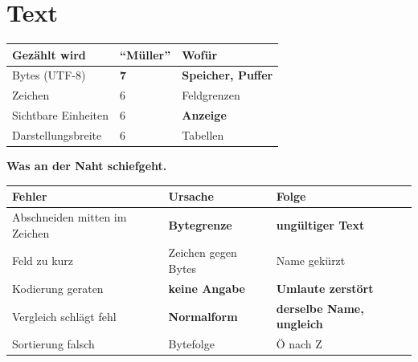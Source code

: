 \chapter{Text}\label{kap:text}

\begin{merksatz}
\begin{center}
\renewcommand{\arraystretch}{1.5}
\begin{tabular}{@{}P{3.2cm}P{2.2cm}P{2.6cm}@{}}
\toprule
\textbf{Gezählt wird} & \enquote{Müller} & \textbf{Wofür}\\
\midrule
Bytes (UTF-8) & $\mathbf{7}$ & \textbf{Speicher, Puffer}\\
Zeichen & $6$ & \textcolor{mittel}{Feldgrenzen}\\
Sichtbare Einheiten & $6$ & \textcolor{gruen}{\textbf{Anzeige}}\\
Darstellungsbreite & $6$ & Tabellen\\
\bottomrule
\end{tabular}
\end{center}

\begin{center}
\begin{minipage}{0.88\textwidth}
\end{minipage}
\end{center}

\textbf{Was an der Naht schiefgeht.}

\begin{center}
{\small
\renewcommand{\arraystretch}{1.45}
\begin{tabular}{@{}P{3.0cm}P{2.4cm}P{2.6cm}@{}}
\toprule
\textbf{Fehler} & \textbf{Ursache} & \textbf{Folge}\\
\midrule
Abschneiden mitten im Zeichen & \textbf{Bytegrenze} & \textcolor{akzent}{\textbf{ungültiger Text}}\\
Feld zu kurz & Zeichen gegen Bytes & \textcolor{akzent}{Name gekürzt}\\
Kodierung geraten & \textbf{keine Angabe} & \textcolor{akzent}{\textbf{Umlaute zerstört}}\\
Vergleich schlägt fehl & \textbf{Normalform} & \textcolor{akzent}{\textbf{derselbe Name, ungleich}}\\
Sortierung falsch & Bytefolge & \textcolor{akzent}{Ö nach Z}\\
\bottomrule
\end{tabular}}
\end{center}


\end{merksatz}
